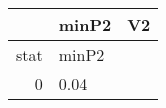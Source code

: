\begin{table}[ht]
\centering
\begingroup\tiny
\begin{tabular}{rll}
  \hline
 & minP2 & V2 \\ 
  \hline
stat & minP2 &  \\ 
  0 & 0.04 &  \\ 
   \hline
\end{tabular}
\endgroup
\end{table}
